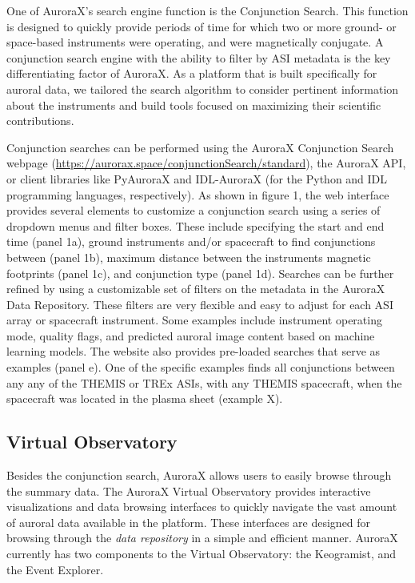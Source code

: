 \documentclass[utf8]{FrontiersinHarvard} %
\begin{document}
One of AuroraX's search engine function is the Conjunction Search. This function is designed to quickly provide periods of time for which two or more ground- or space-based instruments were operating, and were magnetically conjugate. A conjunction search engine with the ability to filter by ASI metadata is the key differentiating factor of AuroraX. As a platform that is built specifically for auroral data, we tailored the search algorithm to consider pertinent information about the instruments and build tools focused on maximizing their scientific contributions.

Conjunction searches can be performed using the AuroraX Conjunction Search webpage (\url{https://aurorax.space/conjunctionSearch/standard}), the AuroraX API, or client libraries like PyAuroraX and IDL-AuroraX (for the Python and IDL programming languages, respectively). As shown in figure 1, the web interface provides several elements to customize a conjunction search using a series of dropdown menus and filter boxes. These include specifying the start and end time (panel 1a), ground instruments and/or spacecraft to find conjunctions between (panel 1b), maximum distance between the instruments magnetic footprints (panel 1c), and conjunction type (panel 1d). Searches can be further refined by using a customizable set of filters on the metadata in the AuroraX Data Repository. These filters are very flexible and easy to adjust for each ASI array or spacecraft instrument. Some examples include instrument operating mode, quality flags, and predicted auroral image content based on machine learning models. The website also provides pre-loaded searches that serve as examples (panel e). One of the specific examples finds all conjunctions between any any of the THEMIS or TREx ASIs, with any THEMIS spacecraft, when the spacecraft was located in the plasma sheet (example X).

\subsection{Virtual Observatory}

Besides the conjunction search, AuroraX allows users to easily browse through the summary data. The AuroraX Virtual Observatory provides interactive visualizations and data browsing interfaces to quickly navigate the vast amount of auroral data available in the platform. These interfaces are designed for browsing through the \textit{data repository} in a simple and efficient manner. AuroraX currently has two components to the Virtual Observatory: the Keogramist, and the Event Explorer.
\end{document}
